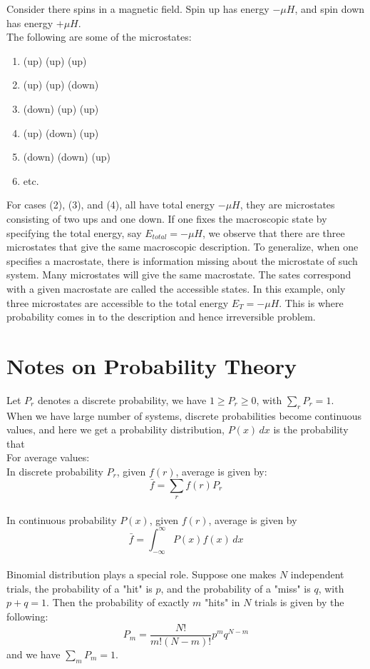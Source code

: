 \documentclass[11pt]{article}
\theoremstyle{break}
\theoremstyle{break}
\begin{document}
Consider there spins in a magnetic field. Spin up has energy $-\mu H$, and spin down has energy $+\mu H$. \\
The following are some of the microstates:
\begin{enumerate}[topsep=3pt,itemsep=-1ex,partopsep=1ex,parsep=1ex]
\item (up) (up) (up)
\item (up) (up) (down)
\item (down) (up) (up)
\item (up) (down) (up)
\item (down) (down) (up)
\item etc.
\end{enumerate}
For cases (2), (3), and (4), all have total energy $-\mu H$, they are microstates consisting of two ups and one down. If one fixes the macroscopic state by specifying the total energy, say $E_{total} = -\mu H$, we observe that there are three microstates that give the same macroscopic description. To generalize, when one specifies a macrostate, there is information missing about the microstate of such system. Many microstates will give the same macrostate. The sates correspond with a given macrostate are called the accessible states. In this example, only three microstates are accessible to the total energy $E_T = -\mu H$. This is where probability comes in to the description and hence irreversible problem. 

\newpage
\section{\color{red} Notes on Probability Theory}
Let $P_r$ denotes a discrete probability, we have $1\geq P_r \geq 0$, with $\sum_r P_r = 1$.\\

When we have large number of systems, discrete probabilities become continuous values, and here we get a probability distribution, $P(x)\, dx$ is the probability that \\


For average values:\\
In discrete probability $P_r$, given $f(r)$, average is given by: $$\bar{f} = \sum_r f(r) P_r$$\\
In continuous probability $P(x)$, given $f(r)$, average is given by $$\bar{f} = \int_{-\infty}^\infty P(x) f(x)\, dx$$ \\

Binomial distribution plays a special role. Suppose one makes $N$ independent trials, the probability of a "hit" is $p$, and the probability of a "miss" is $q$, with $p+q = 1$. Then the probability of exactly $m$ "hits" in $N$ trials is given by the following:
$$P_m = \frac{N!}{m!(N-m)!}p^m q^{N-m}$$
and we have $\sum_m P_m = 1$.
\end{document}
